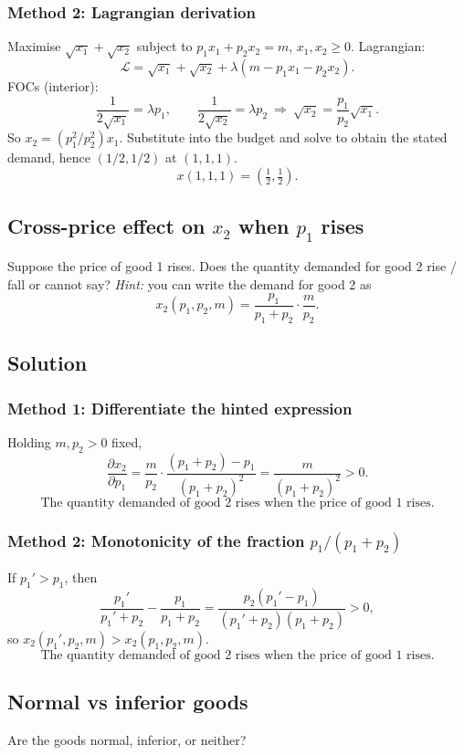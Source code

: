 \documentclass[12pt]{article}
\begin{document}
\subsubsection*{Method 2: Lagrangian derivation}
Maximise \(\sqrt{x_1}+\sqrt{x_2}\) subject to \(p_1x_1+p_2x_2=m\), \(x_1,x_2\ge 0\).
Lagrangian:
\[
\mathcal{L}=\sqrt{x_1}+\sqrt{x_2}+\lambda(m-p_1x_1-p_2x_2).
\]
FOCs (interior):
\[
\frac{1}{2\sqrt{x_1}}=\lambda p_1,\qquad \frac{1}{2\sqrt{x_2}}=\lambda p_2
\ \Rightarrow\ 
\sqrt{x_2}=\frac{p_1}{p_2}\sqrt{x_1}.
\]
So \(x_2=(p_1^2/p_2^2)x_1\). Substitute into the budget and solve to obtain the stated demand, hence \((1/2,1/2)\) at \((1,1,1)\).
\[
\boxed{x(1,1,1)=\left(\tfrac12,\tfrac12\right).}
\]

\newpage
\subsection{Cross-price effect on \(x_2\) when \(p_1\) rises}
Suppose the price of good 1 rises. Does the quantity demanded for good 2 rise / fall or cannot say?
\emph{Hint:} you can write the demand for good 2 as
\[
x_2(p_1,p_2,m)=\frac{p_1}{p_1+p_2}\cdot\frac{m}{p_2}.
\]

\subsection*{Solution}
\subsubsection*{Method 1: Differentiate the hinted expression}
Holding \(m,p_2>0\) fixed,
\[
\frac{\partial x_2}{\partial p_1}
=\frac{m}{p_2}\cdot \frac{(p_1+p_2)-p_1}{(p_1+p_2)^2}
=\frac{m}{(p_1+p_2)^2}>0.
\]
\[
\boxed{\text{The quantity demanded of good 2 rises when the price of good 1 rises.}}
\]

\subsubsection*{Method 2: Monotonicity of the fraction \(p_1/(p_1+p_2)\)}
If \(p_1'>p_1\), then
\[
\frac{p_1'}{p_1'+p_2}-\frac{p_1}{p_1+p_2}
=\frac{p_2(p_1'-p_1)}{(p_1'+p_2)(p_1+p_2)}>0,
\]
so \(x_2(p_1',p_2,m)>x_2(p_1,p_2,m)\).
\[
\boxed{\text{The quantity demanded of good 2 rises when the price of good 1 rises.}}
\]

\subsection{Normal vs inferior goods}
Are the goods normal, inferior, or neither?
\end{document}

